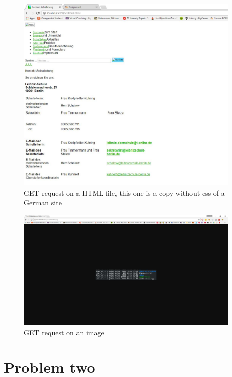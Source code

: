 \documentclass[a4paper,12pt]{article}
\numberwithin{figure}{section}
\begin{document}
\begin{figure}[hp!]
	\centering
	\label{HTML}
	\includegraphics[width=0.95\textwidth,keepaspectratio]{img/HTMLFile.jpg} 
	\caption{GET request on a HTML file, this one is a copy without css of a German site}
\end{figure}

\begin{figure}[hp!]
	\centering
	\label{PNG}
	\includegraphics[width=0.95\textwidth,keepaspectratio]{img/PNGFile.jpg} 
	\caption{GET request on an image}
\end{figure}

\newpage
\section{Problem two}
\end{document}

